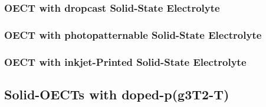 \subsubsection{OECT with dropcast Solid-State Electrolyte}

\subsubsection{OECT with photopatternable Solid-State Electrolyte}

\subsubsection{OECT with inkjet-Printed Solid-State Electrolyte}

\subsection{Solid-OECTs with doped-p(g3T2-T)}




